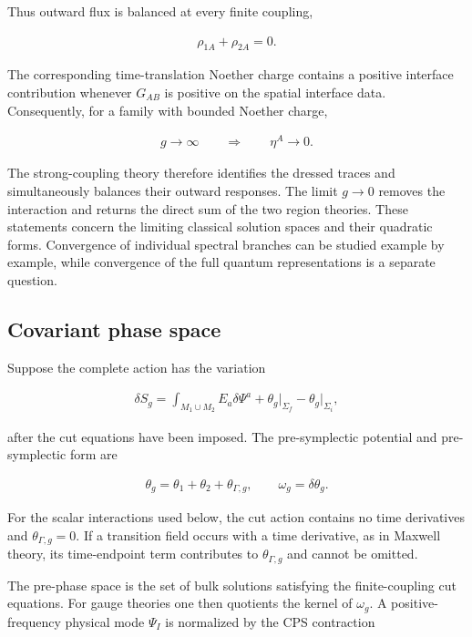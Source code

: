 Thus outward flux is balanced at every finite coupling,

\begin{align}
\rho_{1A}+\rho_{2A}=0.
\end{align}

The corresponding time-translation Noether charge contains a positive interface contribution whenever $G_{AB}$ is positive on the spatial interface data. Consequently, for a family with bounded Noether charge,

\begin{align}
g\longrightarrow\infty
\qquad\Longrightarrow\qquad
\eta^A\longrightarrow0.
\end{align}

The strong-coupling theory therefore identifies the dressed traces and simultaneously balances their outward responses. The limit $g\to0$ removes the interaction and returns the direct sum of the two region theories. These statements concern the limiting classical solution spaces and their quadratic forms. Convergence of individual spectral branches can be studied example by example, while convergence of the full quantum representations is a separate question.

\subsection{Covariant phase space}\label{subsec:formalism-cps}

Suppose the complete action has the variation

\begin{align}
\delta S_g
=\int_{M_1\cup M_2}E_a\delta\Psi^a
+\theta_g\big|_{\Sigma_f}-\theta_g\big|_{\Sigma_i},
\end{align}

after the cut equations have been imposed. The pre-symplectic potential and pre-symplectic form are

\begin{align}
\theta_g=\theta_1+\theta_2+\theta_{\Gamma,g},
\qquad
\omega_g=\delta\theta_g.
\end{align}

For the scalar interactions used below, the cut action contains no time derivatives and $\theta_{\Gamma,g}=0$. If a transition field occurs with a time derivative, as in Maxwell theory, its time-endpoint term contributes to $\theta_{\Gamma,g}$ and cannot be omitted.

The pre-phase space is the set of bulk solutions satisfying the finite-coupling cut equations. For gauge theories one then quotients the kernel of $\omega_g$. A positive-frequency physical mode $\Psi_I$ is normalized by the CPS contraction


